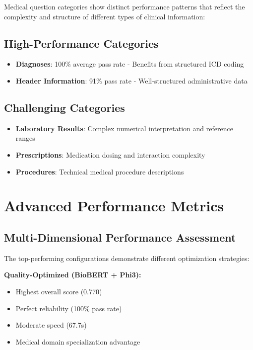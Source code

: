 Medical question categories show distinct performance patterns that reflect the complexity and structure of different types of clinical information:

\subsection{High-Performance Categories}
\begin{itemize}
    \item \textbf{Diagnoses}: 100\% average pass rate - Benefits from structured ICD coding
    \item \textbf{Header Information}: 91\% pass rate - Well-structured administrative data
\end{itemize}

\subsection{Challenging Categories}
\begin{itemize}
    \item \textbf{Laboratory Results}: Complex numerical interpretation and reference ranges
    \item \textbf{Prescriptions}: Medication dosing and interaction complexity
    \item \textbf{Procedures}: Technical medical procedure descriptions
\end{itemize}

\section{Advanced Performance Metrics}



\subsection{Multi-Dimensional Performance Assessment}

The top-performing configurations demonstrate different optimization strategies:

\textbf{Quality-Optimized (BioBERT + Phi3):}
\begin{itemize}
    \item Highest overall score (0.770)
    \item Perfect reliability (100\% pass rate)
    \item Moderate speed (67.7s)
    \item Medical domain specialization advantage
\end{itemize}

